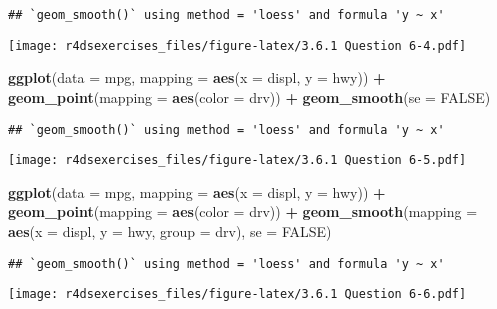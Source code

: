 \documentclass[
]{book}
\newenvironment{Shaded}{\begin{snugshade}}{\end{snugshade}}
\newcommand{\DataTypeTok}[1]{\textcolor[rgb]{0.13,0.29,0.53}{#1}}
\newcommand{\KeywordTok}[1]{\textcolor[rgb]{0.13,0.29,0.53}{\textbf{#1}}}
\newcommand{\NormalTok}[1]{#1}
\newcommand{\OperatorTok}[1]{\textcolor[rgb]{0.81,0.36,0.00}{\textbf{#1}}}
\newcommand{\OtherTok}[1]{\textcolor[rgb]{0.56,0.35,0.01}{#1}}
\newcommand{\StringTok}[1]{\textcolor[rgb]{0.31,0.60,0.02}{#1}}
\begin{document}
\begin{verbatim}
## `geom_smooth()` using method = 'loess' and formula 'y ~ x'
\end{verbatim}

\texttt{[image: r4dsexercises\_files/figure-latex/3.6.1 Question 6-4.pdf]}

\begin{Shaded}
\begin{Highlighting}[]
\KeywordTok{ggplot}\NormalTok{(}\DataTypeTok{data =}\NormalTok{ mpg, }\DataTypeTok{mapping =} \KeywordTok{aes}\NormalTok{(}\DataTypeTok{x =}\NormalTok{ displ, }\DataTypeTok{y =}\NormalTok{ hwy)) }\OperatorTok{+}\StringTok{ }
\StringTok{  }\KeywordTok{geom_point}\NormalTok{(}\DataTypeTok{mapping =} \KeywordTok{aes}\NormalTok{(}\DataTypeTok{color =}\NormalTok{ drv)) }\OperatorTok{+}\StringTok{ }
\StringTok{  }\KeywordTok{geom_smooth}\NormalTok{(}\DataTypeTok{se =} \OtherTok{FALSE}\NormalTok{)}
\end{Highlighting}
\end{Shaded}

\begin{verbatim}
## `geom_smooth()` using method = 'loess' and formula 'y ~ x'
\end{verbatim}

\texttt{[image: r4dsexercises\_files/figure-latex/3.6.1 Question 6-5.pdf]}

\begin{Shaded}
\begin{Highlighting}[]
\KeywordTok{ggplot}\NormalTok{(}\DataTypeTok{data =}\NormalTok{ mpg, }\DataTypeTok{mapping =} \KeywordTok{aes}\NormalTok{(}\DataTypeTok{x =}\NormalTok{ displ, }\DataTypeTok{y =}\NormalTok{ hwy)) }\OperatorTok{+}\StringTok{ }
\StringTok{  }\KeywordTok{geom_point}\NormalTok{(}\DataTypeTok{mapping =} \KeywordTok{aes}\NormalTok{(}\DataTypeTok{color =}\NormalTok{ drv)) }\OperatorTok{+}\StringTok{ }
\StringTok{  }\KeywordTok{geom_smooth}\NormalTok{(}\DataTypeTok{mapping =} \KeywordTok{aes}\NormalTok{(}\DataTypeTok{x =}\NormalTok{ displ, }\DataTypeTok{y =}\NormalTok{ hwy, }\DataTypeTok{group =}\NormalTok{ drv), }\DataTypeTok{se =} \OtherTok{FALSE}\NormalTok{)}
\end{Highlighting}
\end{Shaded}

\begin{verbatim}
## `geom_smooth()` using method = 'loess' and formula 'y ~ x'
\end{verbatim}

\texttt{[image: r4dsexercises\_files/figure-latex/3.6.1 Question 6-6.pdf]}
\end{document}
